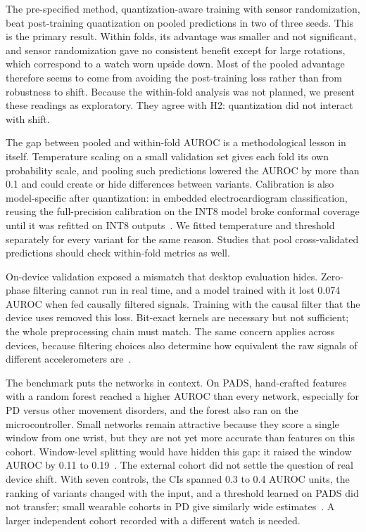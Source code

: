 \documentclass[preprint,12pt]{elsarticle}
\begin{document}
The pre-specified method, quantization-aware training with sensor randomization, beat post-training quantization on pooled predictions in two of three seeds. This is the primary result. Within folds, its advantage was smaller and not significant, and sensor randomization gave no consistent benefit except for large rotations, which correspond to a watch worn upside down. Most of the pooled advantage therefore seems to come from avoiding the post-training loss rather than from robustness to shift. Because the within-fold analysis was not planned, we present these readings as exploratory. They agree with H2: quantization did not interact with shift.

The gap between pooled and within-fold AUROC is a methodological lesson in itself. Temperature scaling on a small validation set gives each fold its own probability scale, and pooling such predictions lowered the AUROC by more than 0.1 and could create or hide differences between variants. Calibration is also model-specific after quantization: in embedded electrocardiogram classification, reusing the full-precision calibration on the INT8 model broke conformal coverage until it was refitted on INT8 outputs~\cite{ElAllam2026}. We fitted temperature and threshold separately for every variant for the same reason. Studies that pool cross-validated predictions should check within-fold metrics as well.

On-device validation exposed a mismatch that desktop evaluation hides. Zero-phase filtering cannot run in real time, and a model trained with it lost 0.074 AUROC when fed causally filtered signals. Training with the causal filter that the device uses removed this loss. Bit-exact kernels are necessary but not sufficient; the whole preprocessing chain must match. The same concern applies across devices, because filtering choices also determine how equivalent the raw signals of different accelerometers are~\cite{CoyleAsbil2026}.

The benchmark puts the networks in context. On PADS, hand-crafted features with a random forest reached a higher AUROC than every network, especially for PD versus other movement disorders, and the forest also ran on the microcontroller. Small networks remain attractive because they score a single window from one wrist, but they are not yet more accurate than features on this cohort. Window-level splitting would have hidden this gap: it raised the window AUROC by 0.11 to 0.19~\cite{Saeb2017,Kapoor2023}. The external cohort did not settle the question of real device shift. With seven controls, the CIs spanned 0.3 to 0.4 AUROC units, the ranking of variants changed with the input, and a threshold learned on PADS did not transfer; small wearable cohorts in PD give similarly wide estimates~\cite{Magni2026}. A larger independent cohort recorded with a different watch is needed.
\end{document}
